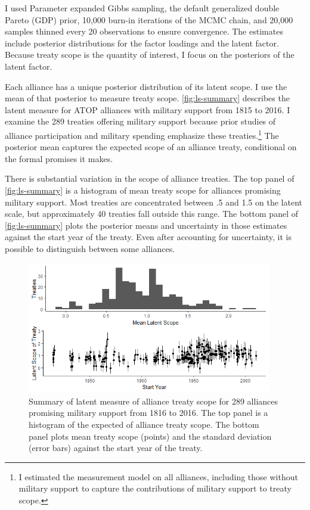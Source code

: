 \documentclass[12pt]{article}
\begin{document}
I used Parameter expanded Gibbs sampling, the default generalized double Pareto (GDP) prior, 10,000 burn-in iterations of the MCMC chain, and 20,000 samples thinned every 20 observations to ensure convergence. 
The estimates include posterior distributions for the factor loadings and the latent factor. 
Because treaty scope is the quantity of interest, I focus on the posteriors of the latent factor. 


Each alliance has a unique posterior distribution of its latent scope. 
I use the mean of that posterior to measure treaty scope. 
\autoref{fig:ls-summary} describes the latent measure for ATOP alliances  with military support from 1815 to 2016.
I examine the 289 treaties offering military support because prior studies of alliance participation and military spending emphasize these treaties.\footnote{
I estimated the measurement model on all alliances, including those without military support to capture the contributions of military support to treaty scope.}
The posterior mean captures the expected scope of an alliance treaty, conditional on the formal promises it makes. 


There is substantial variation in the scope of alliance treaties. 
The top panel of \autoref{fig:ls-summary} is a histogram of mean treaty scope for alliances promising military support.  
Most treaties are concentrated between .5 and 1.5 on the latent scale, but approximately 40 treaties fall outside this range. 
The bottom panel of \autoref{fig:ls-summary} plots the posterior means and uncertainty in those estimates against the start year of the treaty. 
Even after accounting for uncertainty, it is possible to distinguish between some alliances. 


\begin{figure}
	\centering
		\includegraphics[width=0.95\textwidth]{../figures/ls-summary.png}
	\caption{Summary of latent measure of alliance treaty scope for 289 alliances promising military support from 1816 to 2016. The top panel is a histogram of the expected of alliance treaty scope. The bottom panel plots mean treaty scope (points) and the standard deviation (error bars) against the start year of the treaty.}
	\label{fig:ls-summary}
\end{figure}
\end{document}
